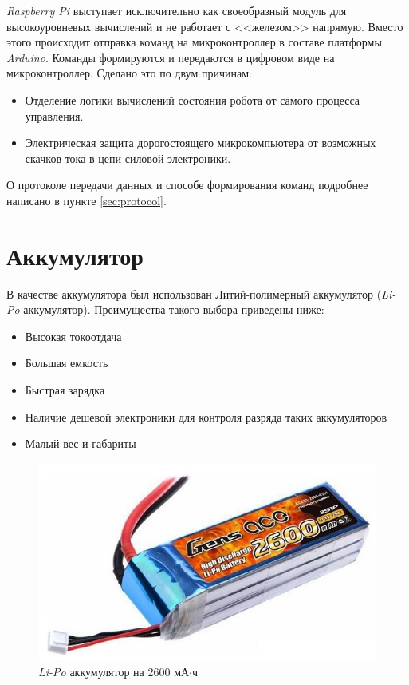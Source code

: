 \textit{Raspberry Pi} выступает исключительно как своеобразный модуль для высокоуровневых вычислений и не работает с <<железом>> напрямую. Вместо этого происходит отправка команд на микроконтроллер в составе платформы \textit{Arduino}. Команды формируются и передаются в цифровом виде на микроконтроллер. Сделано это по двум причинам:
\begin{itemize}
    \item Отделение логики вычислений состояния робота от самого процесса управления.
    \item Электрическая защита дорогостоящего микрокомпьютера от возможных скачков тока в цепи силовой электроники.
\end{itemize}

О протоколе передачи данных и способе формирования команд подробнее написано в пункте \ref{sec:protocol}.

\section{Аккумулятор}
В качестве аккумулятора был использован Литий-полимерный аккумулятор (\textit{Li-Po} аккумулятор). Преимущества такого выбора приведены ниже:
\begin{itemize}
    \item Высокая токоотдача
    \item Большая емкость
    \item Быстрая зарядка
    \item Наличие дешевой электроники для контроля разряда таких аккумуляторов
    \item Малый вес и габариты
\end{itemize}

\begin{figure}[h]
    \centering
    \includegraphics[scale=1]{chapter_mechanics_construction/figure2.png}
    \caption{\textit{Li-Po} аккумулятор на 2600 мА$\cdot$ч}
    \label{}
\end{figure}


